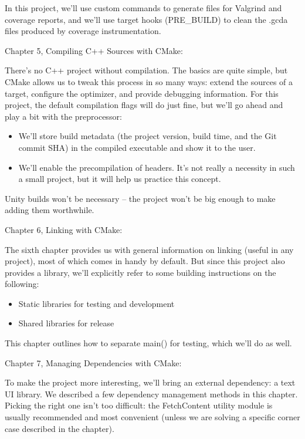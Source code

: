 In this project, we'll use custom commands to generate files for Valgrind and coverage reports, and we'll use target hooks (PRE\_BUILD) to clean the .gcda files produced by coverage instrumentation.

Chapter 5, Compiling C++ Sources with CMake: 

There's no C++ project without compilation. The basics are quite simple, but CMake allows us to tweak this process in so many ways: extend the sources of a target, configure the optimizer, and provide debugging information. For this project, the default compilation flags will do just fine, but we'll go ahead and play a bit with the preprocessor:

\begin{itemize}
\item 
We'll store build metadata (the project version, build time, and the Git commit SHA) in the compiled executable and show it to the user.
	
\item 
We'll enable the precompilation of headers. It's not really a necessity in such a small project, but it will help us practice this concept.
\end{itemize}

Unity builds won't be necessary – the project won't be big enough to make adding them worthwhile.

Chapter 6, Linking with CMake:

The sixth chapter provides us with general information on linking (useful in any project), most of which comes in handy by default. But since this project also provides a library, we'll explicitly refer to some building instructions on the following:

\begin{itemize}
\item 
Static libraries for testing and development

\item 
Shared libraries for release
\end{itemize}

This chapter outlines how to separate main() for testing, which we'll do as well.

Chapter 7, Managing Dependencies with CMake:

To make the project more interesting, we'll bring an external dependency: a text UI library. We described a few dependency management methods in this chapter. Picking the right one isn't too difficult: the FetchContent utility module is usually recommended and most convenient (unless we are solving a specific corner case described in the chapter).

